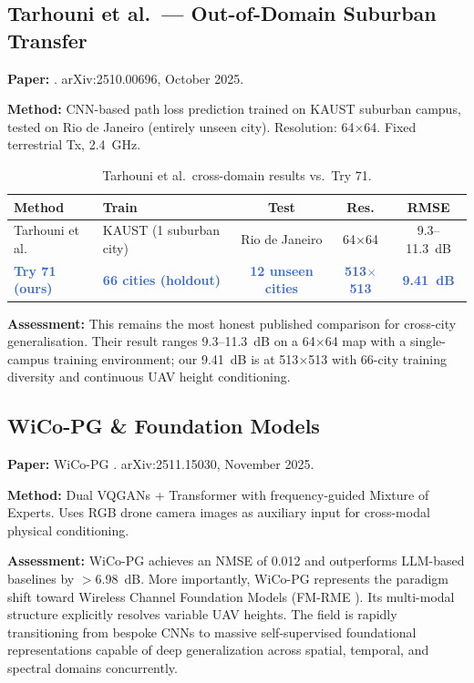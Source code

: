 \documentclass[11pt,a4paper]{article}
\newcommand{\ours}[1]{\textcolor{highlight}{\textbf{#1}}}
\begin{document}
\subsection{Tarhouni et al.\ --- Out-of-Domain Suburban Transfer}

\textbf{Paper:} \cite{tarhouni2025}. arXiv:2510.00696, October 2025.

\textbf{Method:} CNN-based path loss prediction trained on KAUST suburban campus, tested on Rio de Janeiro (entirely unseen city). Resolution: 64$\times$64. Fixed terrestrial Tx, 2.4~GHz.

\begin{table}[h!]
\centering
\caption{Tarhouni et al.\ cross-domain results vs.\ Try 71.}
\label{tab:tarhouni}
\begin{tabularx}{\textwidth}{lXccc}
\toprule
\textbf{Method} & \textbf{Train} & \textbf{Test} & \textbf{Res.} & \textbf{RMSE} \\
\midrule
Tarhouni et al. & KAUST (1 suburban city) & Rio de Janeiro & 64$\times$64 & 9.3--11.3~dB \\
\ours{Try 71 (ours)} & \ours{66 cities (holdout)} & \ours{12 unseen cities} & \ours{513$\times$513} & \ours{9.41~dB} \\
\bottomrule
\end{tabularx}
\end{table}

\textbf{Assessment:} This remains the most honest published comparison for cross-city generalisation. Their result ranges 9.3--11.3~dB on a 64$\times$64 map with a single-campus training environment; our 9.41~dB is at 513$\times$513 with 66-city training diversity and continuous UAV height conditioning.

\subsection{WiCo-PG \& Foundation Models}

\textbf{Paper:} WiCo-PG \cite{wicopg2025}. arXiv:2511.15030, November 2025.

\textbf{Method:} Dual VQGANs + Transformer with frequency-guided Mixture of Experts. Uses RGB drone camera images as auxiliary input for cross-modal physical conditioning.

\textbf{Assessment:} WiCo-PG achieves an NMSE of 0.012 and outperforms LLM-based baselines by $>$6.98~dB. More importantly, WiCo-PG represents the paradigm shift toward Wireless Channel Foundation Models (FM-RME \cite{fmrme2026}). Its multi-modal structure explicitly resolves variable UAV heights. The field is rapidly transitioning from bespoke CNNs to massive self-supervised foundational representations capable of deep generalization across spatial, temporal, and spectral domains concurrently.
\end{document}
